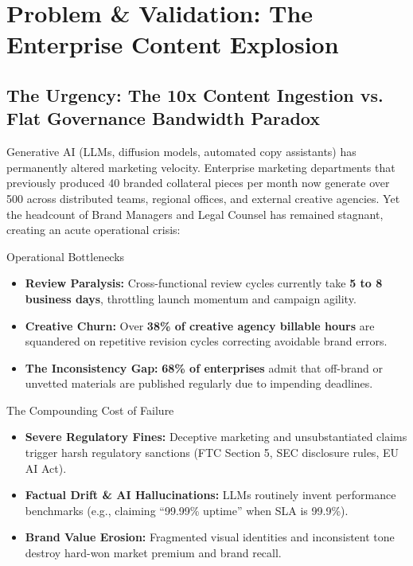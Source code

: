 \documentclass[10pt,a4paper]{article}
\begin{document}
\vspace{0.15cm}

\section{Problem \& Validation: The Enterprise Content Explosion}

\subsection{The Urgency: The 10x Content Ingestion vs. Flat Governance Bandwidth Paradox}
\small Generative AI (LLMs, diffusion models, automated copy assistants) has permanently altered marketing velocity. Enterprise marketing departments that previously produced 40 branded collateral pieces per month now generate over 500 across distributed teams, regional offices, and external creative agencies. Yet the headcount of Brand Managers and Legal Counsel has remained stagnant, creating an acute operational crisis:

\vspace{0.1cm}

\begin{minipage}[t]{0.485\textwidth}
  \begin{brandbox}{Operational Bottlenecks}
    \small
    \begin{itemize}[leftmargin=*,itemsep=1.5pt]
      \item \textbf{Review Paralysis:} Cross-functional review cycles currently take \textbf{5 to 8 business days}, throttling launch momentum and campaign agility.
      \item \textbf{Creative Churn:} Over \textbf{38\% of creative agency billable hours} are squandered on repetitive revision cycles correcting avoidable brand errors.
      \item \textbf{The Inconsistency Gap:} \textbf{68\% of enterprises} admit that off-brand or unvetted materials are published regularly due to impending deadlines.
    \end{itemize}
  \end{brandbox}
\end{minipage}
\hfill
\begin{minipage}[t]{0.485\textwidth}
  \begin{brandbox}{The Compounding Cost of Failure}
    \small
    \begin{itemize}[leftmargin=*,itemsep=1.5pt]
      \item \textbf{Severe Regulatory Fines:} Deceptive marketing and unsubstantiated claims trigger harsh regulatory sanctions (FTC Section 5, SEC disclosure rules, EU AI Act).
      \item \textbf{Factual Drift \& AI Hallucinations:} LLMs routinely invent performance benchmarks (e.g., claiming ``99.99\% uptime'' when SLA is 99.9\%).
      \item \textbf{Brand Value Erosion:} Fragmented visual identities and inconsistent tone destroy hard-won market premium and brand recall.
    \end{itemize}
  \end{brandbox}
\end{minipage}
\end{document}

